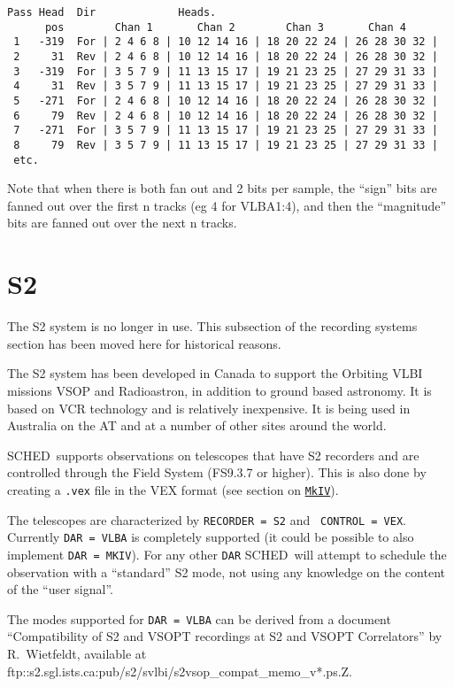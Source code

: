 \documentclass{report}
\newcommand{\schedb}{{\sc SCHED~}}
\begin{document}
\begin{verbatim}
Pass Head  Dir             Heads.
      pos        Chan 1       Chan 2        Chan 3       Chan 4
 1   -319  For | 2 4 6 8 | 10 12 14 16 | 18 20 22 24 | 26 28 30 32 |
 2     31  Rev | 2 4 6 8 | 10 12 14 16 | 18 20 22 24 | 26 28 30 32 |
 3   -319  For | 3 5 7 9 | 11 13 15 17 | 19 21 23 25 | 27 29 31 33 |
 4     31  Rev | 3 5 7 9 | 11 13 15 17 | 19 21 23 25 | 27 29 31 33 |
 5   -271  For | 2 4 6 8 | 10 12 14 16 | 18 20 22 24 | 26 28 30 32 |
 6     79  Rev | 2 4 6 8 | 10 12 14 16 | 18 20 22 24 | 26 28 30 32 |
 7   -271  For | 3 5 7 9 | 11 13 15 17 | 19 21 23 25 | 27 29 31 33 |
 8     79  Rev | 3 5 7 9 | 11 13 15 17 | 19 21 23 25 | 27 29 31 33 |
 etc.
\end{verbatim}

Note that when there is both fan out and 2 bits per sample, the ``sign''
bits are fanned out over the first n tracks (eg 4 for VLBA1:4),
and then the ``magnitude'' bits are fanned out over the next n tracks.



\section{\label{SSEC:S2}S2}

The S2 system is no longer in use.  This subsection of the recording
systems section has been moved here for historical reasons.

The S2 system has been developed in Canada to support
the Orbiting VLBI missions VSOP and Radioastron, in addition to ground
based astronomy.  It is based on VCR technology and is relatively
inexpensive.  It is being used in Australia on the AT and at a number
of other sites around the world.

\schedb supports observations on telescopes that have S2
recorders and are controlled through the Field System (FS9.3.7 or
higher). This is also done by creating a {\tt *.vex} file in the VEX
format (see section on 
{\hyperref[SSEC:MKIV]{{\tt MkIV}}}).

The telescopes are characterized by {\tt RECORDER = S2} and {\tt
  CONTROL = VEX}. Currently {\tt DAR = VLBA} is completely supported
(it could be possible to also implement {\tt DAR = MKIV}). For any
other {\tt DAR} \schedb will attempt to schedule the observation with
a ``standard'' S2 mode, not using any knowledge on the content of the
``user signal''.

The modes supported for {\tt DAR = VLBA} can be derived from a
document ``Compatibility of S2 and VSOPT recordings at S2 and VSOPT
Correlators'' by R.\ Wietfeldt, available at
ftp::s2.sgl.ists.ca:pub/s2/svlbi/s2vsop\_compat\_memo\_v*.ps.Z.
\end{document}
